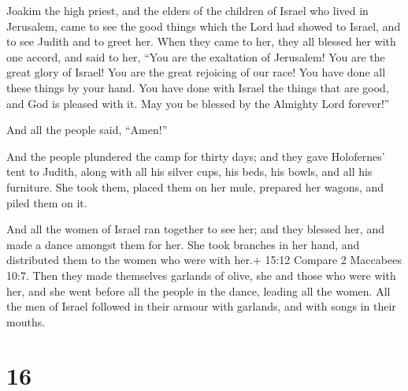  Joakim the high priest, and the elders of the children of
Israel who lived in Jerusalem, came to see the good things which the
Lord had showed to Israel, and to see Judith and to greet her.
 When they came to her, they all blessed her with one
accord, and said to her, ``You are the exaltation of Jerusalem! You are
the great glory of Israel! You are the great rejoicing of our race!
 You have done all these things by your hand. You have done
with Israel the things that are good, and God is pleased with it. May
you be blessed by the Almighty Lord forever!''

And all the people said, ``Amen!''

 And the people plundered the camp for thirty days; and
they gave Holofernes' tent to Judith, along with all his silver cups,
his beds, his bowls, and all his furniture. She took them, placed them
on her mule, prepared her wagons, and piled them on it.

 And all the women of Israel ran together to see her; and
they blessed her, and made a dance amongst them for her. She took
branches in her hand, and distributed them to the women who were with
her.+ 15:12 Compare 2 Maccabees 10:7.  Then they made
themselves garlands of olive, she and those who were with her, and she
went before all the people in the dance, leading all the women. All the
men of Israel followed in their armour with garlands, and with songs in
their mouths.

\hypertarget{section-15}{%
\section{16}\label{section-15}}

